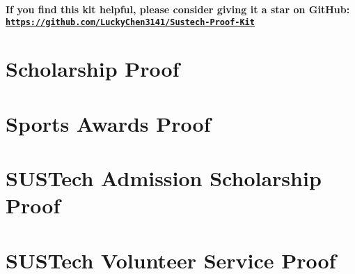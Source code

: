 \documentclass[12pt,a4paper]{article}
\begin{document}
\vspace{0.5cm}

\noindent \textbf{If you find this kit helpful, please consider giving it a star on GitHub: \\
\href{https://github.com/LuckyChen3141/Sustech-Proof-Kit}{\texttt{https://github.com/LuckyChen3141/Sustech-Proof-Kit}}}

\newpage

\section{Scholarship Proof}


\section{Sports Awards Proof}


\section{SUSTech Admission Scholarship Proof}


\section{SUSTech Volunteer Service Proof}


\end{document}
